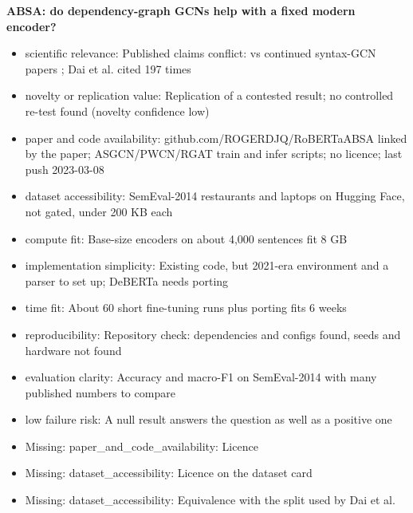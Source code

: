 \documentclass[11pt,a4paper]{article}
\begin{document}
\textbf{ABSA: do dependency-graph GCNs help with a fixed modern encoder?}
\begin{itemize}
\item scientific relevance: Published claims conflict: \cite{dai2021syntax} vs continued syntax-GCN papers \cite{li2024sebert,zhao2023rdgcn,huang2025mvasegcn}; Dai et al. cited 197 times
\item novelty or replication value: Replication of a contested result; no controlled re-test found (novelty confidence low)
\item paper and code availability: github.com/ROGERDJQ/RoBERTaABSA linked by the paper; ASGCN/PWCN/RGAT train and infer scripts; no licence; last push 2023-03-08
\item dataset accessibility: SemEval-2014 restaurants and laptops on Hugging Face, not gated, under 200 KB each
\item compute fit: Base-size encoders on about 4,000 sentences fit 8 GB
\item implementation simplicity: Existing code, but 2021-era environment and a parser to set up; DeBERTa needs porting
\item time fit: About 60 short fine-tuning runs plus porting fits 6 weeks
\item reproducibility: Repository check: dependencies and configs found, seeds and hardware not found
\item evaluation clarity: Accuracy and macro-F1 on SemEval-2014 with many published numbers to compare
\item low failure risk: A null result answers the question as well as a positive one
\item Missing: paper\_and\_code\_availability: Licence
\item Missing: dataset\_accessibility: Licence on the dataset card
\item Missing: dataset\_accessibility: Equivalence with the split used by Dai et al.
\end{itemize}
\end{document}
